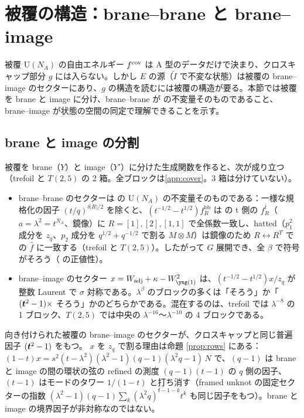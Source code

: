 \section{被覆の構造：brane--brane と brane--image}\label{sec:cover}
被覆 U$(N_A)$ の自由エネルギー $f^{\mathrm{cov}}$ は A 型のデータだけで決まり、クロスキャップ部分 $g$ には入らない。しかし $E$ の源（$\tilde I$ で不変な状態）は被覆の brane--image のセクターにあり、$g$ の構造を読むには被覆の構造が要る。本節では被覆を brane と image に分け、brane--brane が \cite{KN17} の不変量そのものであること、brane--image が状態の空間の同定で理解できることを示す。

\subsection{brane と image の分割}\label{sec:split}
被覆を brane（$Y$）と image（$Y'$）に分けた生成関数を作ると、次が成り立つ（trefoil と $T(2,5)$ の 2 箱。全ブロックは\ref{app:cover}。3 箱は分けていない）。
\begin{itemize}
\item brane--brane のセクターは \cite{KN17} の U$(N_A)$ の不変量そのものである：一様な規格化の因子 $(t/q)^{\delta|R|/2}$ を除くと、$(t^{-1/2} - t^{1/2}) f^{\mathrm{bb}}_R$ は \cite{KN17} の t 側の $f^{\bar t}_R$（$a = \lambda^2 = t^{N_A}$、鏡像）に $R = [1], [2], [1,1]$ で全係数一致し、hatted（$p_1^2$ 成分を $z_q$、$p_2$ 成分を $q^{1/2} + q^{-1/2}$ で割る $M \otimes M$）は鏡像のため $R \leftrightarrow R^T$ で \cite{KN17} の $\hat f$ に一致する（trefoil と $T(2,5)$）。したがって $G$ 展開でき、全 $\beta$ で符号がそろう（\cite{KN17} の正値性）。
\item brane--image のセクター $x = W_{\mathrm{adj}} + \kappa - W_{\yone}^2$ は、$(t^{-1/2} - t^{1/2})x/z_q$ が整数 Laurent で $\sigma$ 対称である。$\lambda^\beta$ のブロックの多くは「そろう」か「$(\bm{t}^2 - 1)\times$ そろう」かのどちらかである。混在するのは、trefoil では $\lambda^{-8}$ の 1 ブロック、$T(2,5)$ では中央の $\lambda^{-16}$〜$\lambda^{-10}$ の 4 ブロックである。
\end{itemize}
向き付けられた被覆の brane--image のセクターが、クロスキャップと同じ普遍因子 $(\bm{t}^2 - 1)$ をもつ。
$x$ を $z_q$ で割る理由は命題 \ref{prop:rows} にある：$(1-t)x = s^2(t - \lambda^2)(\lambda^2 - 1)(q - 1)(\lambda^2 q - 1)\,N$ で、$(q-1)$ は brane と image の間の環状の弦の refined の測度 $(q-1)(t-1)$ の $q$ 側の因子、$(t-1)$ はモードのタワー $1/(1-t)$ と打ち消す（framed unknot の固定セクターの指数 $(\lambda^2-1)(q-1)\sum_k(\lambda^2q)^{\mathsf f-1-k}t^k$ も同じ因子をもつ）。brane と image の境界因子が非対称なのではない。
